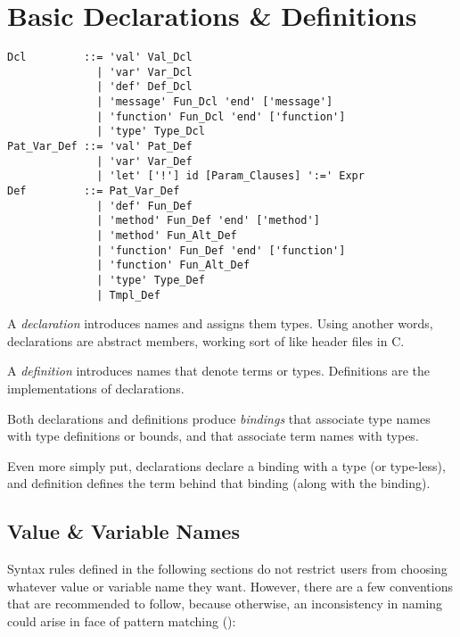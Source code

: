 
\chapter{Basic Declarations \& Definitions}

\syntax\begin{lstlisting}
Dcl         ::= 'val' Val_Dcl
              | 'var' Var_Dcl
              | 'def' Def_Dcl
              | 'message' Fun_Dcl 'end' ['message']
              | 'function' Fun_Dcl 'end' ['function']
              | 'type' Type_Dcl
Pat_Var_Def ::= 'val' Pat_Def
              | 'var' Var_Def
              | 'let' ['!'] id [Param_Clauses] ':=' Expr
Def         ::= Pat_Var_Def
              | 'def' Fun_Def
              | 'method' Fun_Def 'end' ['method']
              | 'method' Fun_Alt_Def
              | 'function' Fun_Def 'end' ['function']
              | 'function' Fun_Alt_Def
              | 'type' Type_Def
              | Tmpl_Def
\end{lstlisting}

A {\em declaration} introduces names and assigns them types. Using another words, declarations are abstract members, working sort of like header files in C. 

A {\em definition} introduces names that denote terms or types. Definitions are the implementations of declarations. 

Both declarations and definitions produce {\em bindings} that associate type names with type definitions or bounds, and that associate term names with types. 

Even more simply put, declarations declare a binding with a type (or type-less), and definition defines the term behind that binding (along with the binding). 





\section{Value \& Variable Names}
\label{sec:val-var-names}

Syntax rules defined in the following sections do not restrict users from choosing whatever value or variable name they want. However, there are a few conventions that are recommended to follow, because otherwise, an inconsistency in naming could arise in face of pattern matching ():

